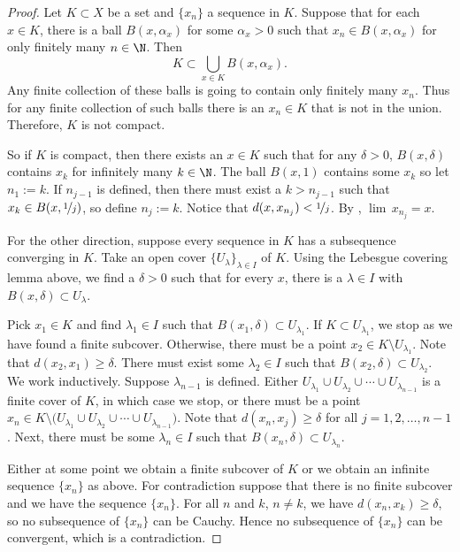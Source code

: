 \documentclass[12pt]{book}
\begin{document}
\begin{proof}
Let $K \subset X$ be a set and
$\{ x_n \}$ a sequence in $K$.
Suppose that for each $x \in K$,
there is a ball $B(x,\alpha_x)$ for some $\alpha_x > 0$ such that
$x_n \in B(x,\alpha_x)$ for only finitely many $n \in \N$.
Then
\begin{equation*}
K \subset \bigcup_{x \in K} B(x,\alpha_x) .
\end{equation*}
Any finite collection of these balls is going to contain only finitely many
$x_n$.
Thus for any finite collection of such balls there is an $x_n \in K$
that is not in the union.
Therefore, $K$ is not compact.

So if $K$ is compact,
then there exists an $x \in K$ such that
for any $\delta > 0$,
$B(x,\delta)$ contains $x_k$ for infinitely many $k \in \N$.
The ball $B(x,1)$ contains some $x_k$ so let $n_1 := k$.
If $n_{j-1}$ is defined, then there must
exist a $k > n_{j-1}$ such that $x_k \in B(x,\nicefrac{1}{j})$, so define
$n_j := k$.
Notice that
$d(x,x_{n_j}) < \nicefrac{1}{j}$.
By ,
$\lim\, x_{n_j} = x$.

For the other direction, suppose every sequence in $K$
has a 
subsequence converging in $K$.
Take
an open cover $\{ U_\lambda \}_{\lambda \in I}$ of $K$.
Using the Lebesgue covering lemma above, we find a $\delta > 0$
such that for every $x$, there is a $\lambda \in I$ with
$B(x,\delta) \subset U_\lambda$.

Pick $x_1 \in K$ and find $\lambda_1 \in I$ such that $B(x_1,\delta) \subset
U_{\lambda_1}$.
If $K \subset U_{\lambda_1}$, we stop as we have found a
finite subcover.
Otherwise, there must be
a point $x_2 \in K \setminus U_{\lambda_1}$.
Note that $d(x_2,x_1) \geq \delta$.
There must exist some $\lambda_2 \in I$ such that
$B(x_2,\delta) \subset U_{\lambda_2}$.
We work inductively.
Suppose $\lambda_{n-1}$ is defined.
Either
$U_{\lambda_1} \cup
U_{\lambda_2} \cup \cdots \cup
U_{\lambda_{n-1}}$ is a finite cover of $K$, in which case we
stop, or
there must be 
a point $x_n \in K \setminus \bigl( U_{\lambda_1} \cup
U_{\lambda_2} \cup \cdots \cup
U_{\lambda_{n-1}}\bigr)$.
Note that $d(x_n,x_j) \geq \delta$ for all $j = 1,2,\ldots,n-1$.
Next, there must be some $\lambda_n \in I$
such that $B(x_n,\delta) \subset U_{\lambda_n}$.

Either at some point we obtain a finite subcover of $K$
or we obtain an
infinite
sequence $\{ x_n \}$ as above.
For contradiction suppose that
there is no finite subcover and we have the sequence $\{ x_n \}$.
For all $n$ and $k$, $n \not= k$, 
we have $d(x_n,x_k) \geq \delta$,
so no subsequence of $\{ x_n \}$ can be
Cauchy.
Hence no subsequence of $\{ x_n \}$ can be convergent,
which is a contradiction.
\end{proof}
\end{document}
